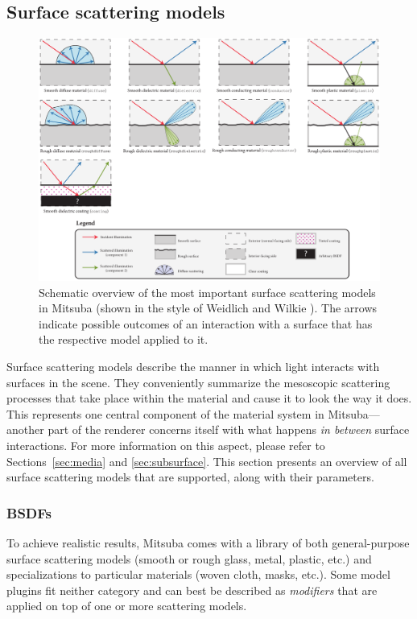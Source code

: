 \subsection{Surface scattering models}
\begin{figure}[h!]
\centering
\includegraphics[width=15.5cm]{images/bsdf_overview.pdf}
\caption{
	Schematic overview of the most important surface scattering models in
	Mitsuba (shown in the style of Weidlich and Wilkie \cite{Weidlich2007Arbitrarily}). The arrows indicate possible outcomes of an
	interaction with a surface that has the respective model applied to it.
	\vspace{4mm}
}
\end{figure}

\label{sec:bsdfs}
Surface scattering models describe the manner in which light interacts
with surfaces in the scene. They conveniently summarize the mesoscopic 
scattering processes that take place within the material and 
cause it to look the way it does.
This represents one central component of the material system in Mitsuba---another 
part of the renderer concerns itself with what happens 
\emph{in between} surface interactions. For more information on this aspect, 
please refer to Sections~\ref{sec:media} and \ref{sec:subsurface}.
This section presents an overview of all surface scattering models that are 
supported, along with their parameters.

\subsubsection*{BSDFs}
To achieve realistic results, Mitsuba comes with a library of both 
general-purpose surface scattering models (smooth or rough glass, metal,
plastic, etc.) and specializations to particular materials (woven cloth,
masks, etc.). Some model plugins fit neither category and can best be described
as \emph{modifiers} that are applied on top of one or more scattering models. 

